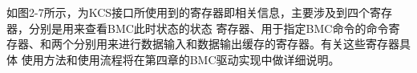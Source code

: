 如图2-7所示，为KCS接口所使用到的寄存器即相关信息，主要涉及到四个寄存器，分别是用来查看BMC此时状态的状态
寄存器、用于指定BMC命令的命令寄存器、和两个分别用来进行数据输入和数据输出缓存的寄存器。有关这些寄存器具体
使用方法和使用流程将在第四章的BMC驱动实现中做详细说明。

%
%



\bjutclearpage